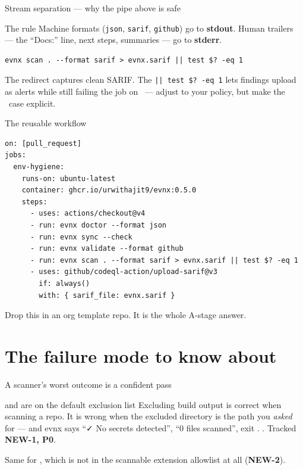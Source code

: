 \documentclass[aspectratio=169,10pt]{beamer}
\begin{document}
\begin{frame}[fragile]{Stream separation --- why the pipe above is safe}
  \begin{block}{The rule}
    Machine formats (\texttt{json}, \texttt{sarif}, \texttt{github}) go to
    \textbf{stdout}. Human trailers --- the ``Docs:'' line, next steps,
    summaries --- go to \textbf{stderr}.
  \end{block}

  \vspace{0.7em}
\begin{lstlisting}[style=evnxcode]
evnx scan . --format sarif > evnx.sarif || test $? -eq 1
\end{lstlisting}

  \vspace{0.5em}
  {\footnotesize The redirect captures clean SARIF. The \texttt{|| test \$? -eq 1}
  lets findings upload as alerts while still failing the job on \exittwo\ ---
  adjust to your policy, but make the \exittwo\ case explicit.}
\end{frame}

\begin{frame}[fragile]{The reusable workflow}
\begin{lstlisting}[style=evnxcode]
on: [pull_request]
jobs:
  env-hygiene:
    runs-on: ubuntu-latest
    container: ghcr.io/urwithajit9/evnx:0.5.0
    steps:
      - uses: actions/checkout@v4
      - run: evnx doctor --format json
      - run: evnx sync --check
      - run: evnx validate --format github
      - run: evnx scan . --format sarif > evnx.sarif || test $? -eq 1
      - uses: github/codeql-action/upload-sarif@v3
        if: always()
        with: { sarif_file: evnx.sarif }
\end{lstlisting}
  {\footnotesize Drop this in an org template repo. It is the whole A-stage
  answer.}
\end{frame}

\section{The failure mode to know about}

\begin{frame}[fragile]{A scanner's worst outcome is a confident pass}

  \vspace{0.4em}
  \begin{trap}{ and  are on the default exclusion list}
    Excluding build output is correct when scanning a repo. It is wrong when
    the excluded directory is the path you \emph{asked} for --- and evnx says
    ``✓ No secrets detected'', ``0 files scanned'', exit \exitzero.
    . Tracked \textbf{NEW-1, P0}.
  \end{trap}

  \vspace{0.3em}
  {\footnotesize Same for , which is not in the scannable
  extension allowlist at all (\textbf{NEW-2}).}
\end{frame}
\end{document}
